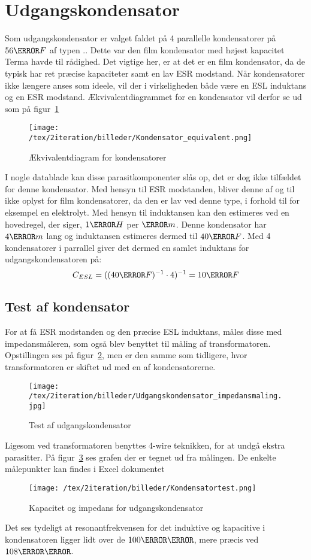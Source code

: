 \section{Udgangskondensator}
Som udgangskondensator er valget faldet på 4 parallelle kondensatorer på $56\micro F$ af typen .. Dette var den film kondensator med højest kapacitet Terma havde til rådighed. Det vigtige her, er at det er en film kondensator, da de typisk har ret præcise kapaciteter samt en lav ESR modstand. Når kondensatorer ikke længere anses som ideele, vil der i virkeligheden både være en ESL induktans og en ESR modstand. Ækvivalentdiagrammet for en kondensator vil derfor se ud som på figur~\ref{fig: con_equi} 
\begin{figure}[H]
	\center
	\texttt{[image: /tex/2iteration/billeder/Kondensator\_equivalent.png]}
	\caption{Ækvivalentdiagram for kondensatorer}
	\label{fig: con_equi}
\end{figure}
I nogle datablade kan disse parasitkomponenter slås op, det er dog ikke tilfældet for denne kondensator. Med hensyn til ESR modstanden, bliver denne af og til ikke oplyst for film kondensatorer, da den er lav ved denne type, i forhold til for eksempel en elektrolyt. 
Med hensyn til induktansen kan den estimeres ved en hovedregel, der siger, $1\nano H$ per $\milli m$. Denne kondensator har $4\centi m$ lang og induktansen estimeres dermed til $40\nano F$. Med 4 kondensatorer i parrallel giver det dermed en samlet induktans for udgangskondensatoren på:
\begin{equation} \label{ESL}
C_{ESL} = ((40\nano F)^{-1} \cdot 4)^{-1} = 10\nano F
\end{equation}

\subsection{Test af kondensator}

For at få ESR modstanden og den præcise ESL induktans, måles disse med impedansmåleren, som også blev benyttet til måling af transformatoren. Opstillingen ses på figur~\ref{fig: cap}, men er den samme som tidligere, hvor transformatoren er skiftet ud med en af kondensatorerne. 
\begin{figure}[H]
	\center
	\texttt{[image: /tex/2iteration/billeder/Udgangskondensator\_impedansmaling.jpg]}
	\caption{Test af udgangskondensator}
	\label{fig: cap}
\end{figure}
Ligesom ved transformatoren benyttes 4-wire teknikken, for at undgå ekstra parasitter. På figur~\ref{fig: captest} ses grafen der er tegnet ud fra målingen. De enkelte målepunkter kan findes i Excel dokumentet \cite{Kondensator_impedans.xlsx}
\begin{figure}[H]
	\center
	\texttt{[image: /tex/2iteration/billeder/Kondensatortest.png]}
	\caption{Kapacitet og impedans for udgangskondensator}
	\label{fig: captest}
\end{figure}
Det ses tydeligt at resonantfrekvensen for det induktive og kapacitive i kondensatoren ligger lidt over de $100\kilo \hertz$, mere præcis ved $108\kilo \hertz$. 


